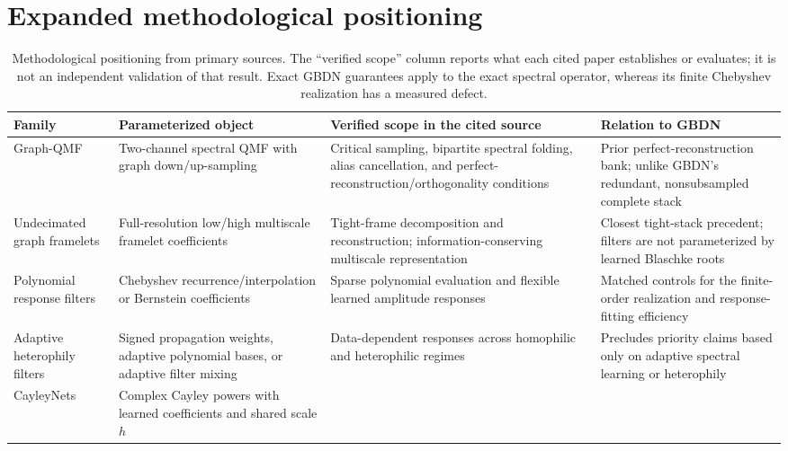 \section{Expanded methodological positioning}
\label{app:related-positioning}

\begin{table}[!ht]
\centering
\scriptsize
\setlength{\tabcolsep}{3pt}
\renewcommand{\arraystretch}{1.04}
\caption{Methodological positioning from primary sources. The ``verified scope''
column reports what each cited paper establishes or evaluates; it is not an
independent validation of that result. Exact GBDN guarantees apply to the exact
spectral operator, whereas its finite Chebyshev realization has a measured defect.}
\label{tab:related-positioning}
\begin{tabularx}{\textwidth}{@{}>{\raggedright\arraybackslash}p{}>{\raggedright\arraybackslash}p{}>{\raggedright\arraybackslash}p{}X@{}}
\toprule
Family & Parameterized object & Verified scope in the cited source & Relation to GBDN \\
\midrule
Graph-QMF~\cite{narang2012graphqmf}
& Two-channel spectral QMF with graph down/up-sampling
& Critical sampling, bipartite spectral folding, alias cancellation, and perfect-reconstruction/orthogonality conditions
& Prior perfect-reconstruction bank; unlike GBDN's redundant, nonsubsampled complete stack \\
Undecimated graph framelets~\cite{zheng2021framelets}
& Full-resolution low/high multiscale framelet coefficients
& Tight-frame decomposition and reconstruction; information-conserving multiscale representation
& Closest tight-stack precedent; filters are not parameterized by learned Blaschke roots \\
Polynomial response filters~\cite{defferrard2016chebnet,he2022chebnetii,he2021bernnet}
& Chebyshev recurrence/interpolation or Bernstein coefficients
& Sparse polynomial evaluation and flexible learned amplitude responses
& Matched controls for the finite-order realization and response-fitting efficiency \\
Adaptive heterophily filters~\cite{chien2021gprgnn,huang2024unifilter,zhang2025herofilter}
& Signed propagation weights, adaptive polynomial bases, or adaptive filter mixing
& Data-dependent responses across homophilic and heterophilic regimes
& Precludes priority claims based only on adaptive spectral learning or heterophily \\
CayleyNets~\cite{levie2019cayleynets}
& Complex Cayley powers with learned coefficients and shared scale $h$

\end{tabularx}
\end{table}
